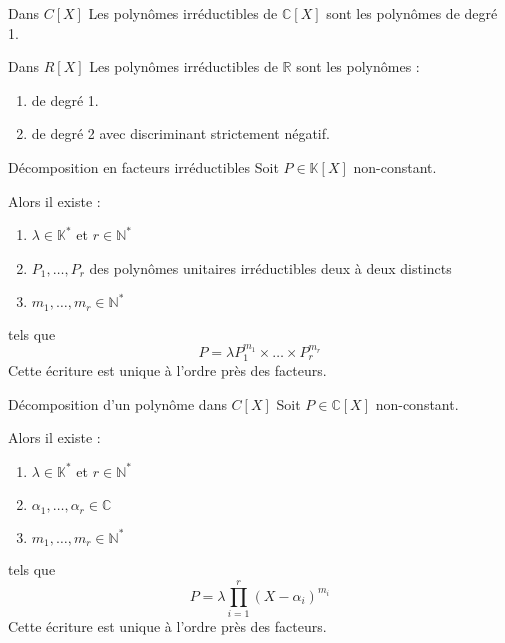     \begin{prop}{Dans $C[X]$}{}
        Les polynômes irréductibles de $\mathbb{C}[X]$ sont les polynômes de degré 1.
    \end{prop}
    
    \begin{coro}{Dans $R[X]$}{}
        Les polynômes irréductibles de $\mathbb{R}$ sont les polynômes :
        \begin{enumerate}
            \item de degré 1.
            \item de degré 2 avec discriminant strictement négatif.
        \end{enumerate}
    \end{coro}

    \begin{theo}{Décomposition en facteurs irréductibles}{}
        Soit $P \in \mathbb{K}[X]$ non-constant.
    
        Alors il existe : 
            \begin{enumerate}
                \item $\lambda \in \mathbb{K}^*$ et $r \in \mathbb{N}^*$
                \item $P_1, \ldots, P_r$ des polynômes unitaires irréductibles deux à deux distincts
                \item $m_1,\ldots,m_r \in \mathbb{N}^*$
            \end{enumerate}    
        tels que \[ P = \lambda P_1^{m_1} \times \ldots \times P_r^{m_r} \] 
        Cette écriture est unique à l’ordre près des facteurs.
    \end{theo}

    \begin{coro}{Décomposition d’un polynôme dans $C[X]$}{}
        Soit $P \in \mathbb{C}[X]$ non-constant.
    
        Alors il existe : 
            \begin{enumerate}
                \item $\lambda \in \mathbb{K}^*$ et $r \in \mathbb{N}^*$
                \item $\alpha_1, \ldots, \alpha_r \in \mathbb{C}$
                \item $m_1,\ldots,m_r \in \mathbb{N}^*$
            \end{enumerate}    
        tels que \[ P = \lambda \prod\limits_{i=1}^{r} (X- \alpha_i)^{m_i} \] 
        Cette écriture est unique à l’ordre près des facteurs.
    \end{coro}

